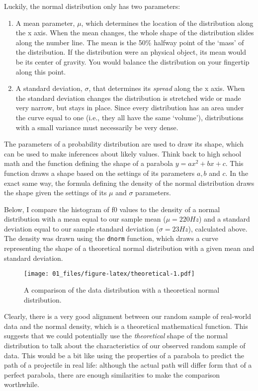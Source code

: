 \documentclass[
]{book}
\begin{document}
Luckily, the normal distribution only has two parameters:

\begin{enumerate}
\def\labelenumi{\arabic{enumi}.}
\item
  A mean parameter, \(\mu\), which determines the location of the distribution along the x axis. When the mean changes, the whole shape of the distribution slides along the number line. The mean is the 50\% halfway point of the `mass' of the distribution. If the distribution were an physical object, its mean would be its center of gravity. You would balance the distribution on your fingertip along this point.
\item
  A standard deviation, \(\sigma\), that determines its \emph{spread} along the x axis. When the standard deviation changes the distribution is stretched wide or made very narrow, but stays in place. Since every distribution has an area under the curve equal to one (i.e., they all have the same `volume'), distributions with a small variance must necessarily be very dense.
\end{enumerate}

The parameters of a probability distribution are used to draw its shape, which can be used to make inferences about likely values. Think back to high school math and the function defining the shape of a parabola \(y = ax^2+bx+c\). This function draws a shape based on the settings of its parameters \(a, b\) and \(c\). In the exact same way, the formula defining the density of the normal distribution draws the shape given the settings of its \(\mu\) and \(\sigma\) parameters.

Below, I compare the histogram of f0 values to the density of a normal distribution with a mean equal to our sample mean (\(\mu = 220 Hz\)) and a standard deviation equal to our sample standard deviation (\(\sigma = 23 Hz\)), calculated above. The density was drawn using the \texttt{dnorm} function, which draws a curve representing the shape of a theoretical normal distribution with a given mean and standard deviation.

\begin{figure}
\centering
\texttt{[image: 01\_files/figure-latex/theoretical-1.pdf]}
\caption{\label{fig:theoretical}A comparison of the data distribution with a theoretical normal distribution.}
\end{figure}

Clearly, there is a very good alignment between our random sample of real-world data and the normal density, which is a theoretical mathematical function. This suggests that we could potentially use the \emph{theoretical} shape of the normal distribution to talk about the characteristics of our observed random sample of data. This would be a bit like using the properties of a parabola to predict the path of a projectile in real life: although the actual path will differ form that of a perfect parabola, there are enough similarities to make the comparison worthwhile.
\end{document}
